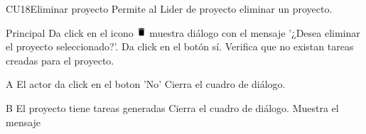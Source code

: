 \begin{UseCase}{CU18}{Eliminar proyecto}{
		Permite al Lider de proyecto eliminar un proyecto.
	}
	\end{UseCase}
	\begin{UCtrayectoria}{Principal}
		\UCpaso[\UCactor] Da click en el icono \includegraphics[height=10pt]{./images/iconos/ic_delete_black_18dp.png}
        \UCpaso [\UCsist] muestra diálogo con el mensaje '¿Desea eliminar el proyecto seleccionado?'.
        \UCpaso [\UCactor] Da click en el botón sí. 
        \UCpaso [\UCsist] Verifica que no existan tareas creadas para el proyecto.
	\end{UCtrayectoria}

		\begin{UCtrayectoriaA}{A}{ El actor da click en el boton 'No'}
			\UCpaso [\UCsist] Cierra el cuadro de diálogo.
		\end{UCtrayectoriaA}
		
		\begin{UCtrayectoriaA}{B}{ El proyecto tiene tareas generadas}
			\UCpaso [\UCsist] Cierra el cuadro de diálogo.
			\UCpaso [\UCsist] Muestra el mensaje 
		\end{UCtrayectoriaA}		
		
		
